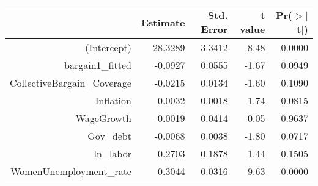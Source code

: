 \begin{table}[ht]
\centering
\begin{tabular}{rrrrr}
  \hline
 & Estimate & Std. Error & t value & Pr($>$$|$t$|$) \\ 
  \hline
(Intercept) & 28.3289 & 3.3412 & 8.48 & 0.0000 \\ 
  bargain1\_fitted & -0.0927 & 0.0555 & -1.67 & 0.0949 \\ 
  CollectiveBargain\_Coverage & -0.0215 & 0.0134 & -1.60 & 0.1090 \\ 
  Inflation & 0.0032 & 0.0018 & 1.74 & 0.0815 \\ 
  WageGrowth & -0.0019 & 0.0414 & -0.05 & 0.9637 \\ 
  Gov\_debt & -0.0068 & 0.0038 & -1.80 & 0.0717 \\ 
  ln\_labor & 0.2703 & 0.1878 & 1.44 & 0.1505 \\ 
  WomenUnemployment\_rate & 0.3044 & 0.0316 & 9.63 & 0.0000 \\ 
   \hline
\end{tabular}
\end{table}
